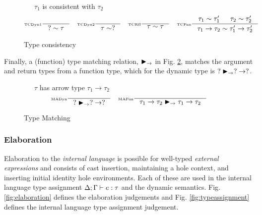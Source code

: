 \begin{figure}[H]
\small
{}\ \ \ $\tau_1$ is consistent with $\tau_2$
\tiny
\[\inference[\tiny TCDyn1]{}{? \sim \tau} \quad \inference[\tiny TCDyn2]{}{\tau \sim ?} \quad \inference[\tiny TCRfl]{}{\tau \sim \tau} \quad \inference[\tiny TCFun]{\tau_1 \sim \tau_1' & \tau_2 \sim \tau_2'}{\tau_1 \to \tau_2 \sim \tau_1' \to \tau_2'}\]
\caption{Type consistency}
\label{fig:consistency}
\end{figure}
Finally, a (function) type matching relation, $\blacktriangleright_\rightarrow$ in Fig. \ref{fig:typematching}, matches the argument and return types from a function type, which for the dynamic type is $? \blacktriangleright_\rightarrow ? -> ?$. 
\begin{figure}[h]
\small
{}\ \ \ $\tau$ has arrow type $\tau_1 \to \tau_2$
\tiny
\[\inference[\tiny MADyn]{}{? \funmatch ? \to ?} \quad 
\inference[\tiny MAFun]{}{\tau_1 \to \tau_2 \funmatch \tau_1 \to \tau_2}\]
\caption{Type Matching}
\label{fig:typematching}
\end{figure}


\subsubsection{Elaboration}
Elaboration to the \textit{internal language} is possible for well-typed \textit{external expressions} and consists of cast insertion, maintaining a hole context, and inserting initial identity hole environments. Each of these are used in the internal language type assignment $\Delta;\Gamma \vdash e : \tau$ and the dynamic semantics. Fig. \ref{fig:elaboration} defines the elaboration judgements and Fig. \ref{fig:typeassignment} defines the internal language type assignment judgement.


